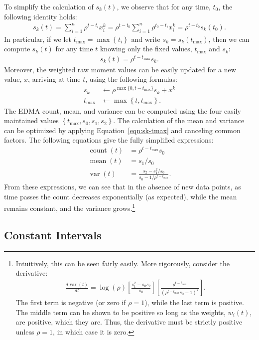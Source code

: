 \documentclass{article}
\DeclareMathOperator{\cnt}{count}
\DeclareMathOperator{\mean}{mean}
\DeclareMathOperator{\var}{var}
\newcommand{\tmax}{{t_\text{max}}}
\begin{document}
To simplify the calculation of $s_k(t)$, we observe that for any time, $t_0$, the following identity holds:
\begin{align}
s_k(t)
= \sum_{i=1}^{n}{\rho^{t-t_i} x_i^k}
= \rho^{t-t_0} \sum_{i=1}^{n}{\rho^{t_0-t_i} x_i^k} 
= \rho^{t-t_0} s_k(t_0).
\end{align}
In particular, if we let $\tmax=\max\left\{t_i\right\}$ and write $s_k=s_k(\tmax)$, then we can compute $s_k(t)$ for any time $t$ knowing only the fixed values, $\tmax$ and $s_k$:
\begin{align}
\label{eqn:sk-tmax}
s_k(t) = \rho^{t-\tmax} s_k.
\end{align}
Moreover, the weighted raw moment values can be easily updated for a new value, $x$, arriving at time $t$, using the following formulas:
\begin{align}
s_k &\leftarrow \rho^{\max\{0,t-\tmax\}} s_k + x^k \label{eqn:sk-update} \\
\tmax &\leftarrow \max\left\{t,\tmax\right\}. \label{eqn:tmax-update}
\end{align}
The EDMA count, mean, and variance can be computed using the four easily maintained values $\left\{\tmax,s_0,s_1,s_2\right\}$. The calculation of the mean and variance can be optimized by applying Equation~\ref{eqn:sk-tmax} and canceling common factors. The following equations give the fully simplified expressions:
\begin{align}
\cnt(t) &= \rho^{t-\tmax} s_0 \\
\mean(t) &= s_1/s_0 \\
\var(t) &= \frac{s_2 - s_1^2/s_0}{s_0-1/\rho^{t-\tmax}}.
\end{align}
From these expressions, we can see that in the absence of new data points, as time passes the count decreases exponentially (as expected), while the mean remains constant, and the variance grows.\footnote{Intuitively, this can be seen fairly easily. More rigorously, consider the derivative:
\begin{align}
\frac{d \var(t)}{d t} =
\log(\rho)
\left[ \frac{s_1^2 - s_0 s_2}{s_0} \right]
\left[ \frac{\rho^{t-\tmax}}{(\rho^{t-\tmax} s_0 - 1)^2} \right].
\end{align}
The first term is negative (or zero if $\rho=1$), while the last term is positive. The middle term can be shown to be positive so long as the weights, $w_i(t)$, are positive, which they are. Thus, the derivative must be strictly positive unless $\rho=1$, in which case it is zero.
}

\subsection{Constant Intervals}
\end{document}
